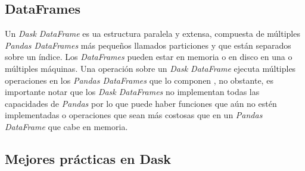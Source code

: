 \subsection{DataFrames}

Un \textit{Dask DataFrame} es ua estructura paralela y extensa, compuesta de múltiples \textit{Pandas DataFrames} más pequeños llamados particiones y que están separados sobre un índice. Los \textit{DataFrames} pueden estar en memoria o en disco en una o múltiples máquinas. Una operación sobre un \textit{Dask DataFrame} ejecuta múltiples operaciones en los \textit{Pandas DataFrames} que lo componen \cite{daskdataframe}, no obstante, es importante notar que los \textit{Dask DataFrames} no implementan todas las capacidades de \textit{Pandas} por lo que puede haber funciones que aún no estén implementadas o operaciones que sean más costosas que en un \textit{Pandas DataFrame} que cabe en memoria.


\subsection{Mejores prácticas en Dask}

